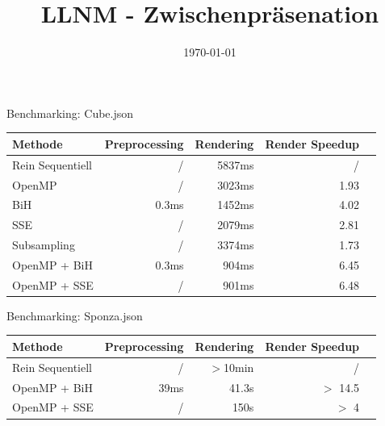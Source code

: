 


\title[LLNM]{LLNM - Zwischenpräsenation}
\subtitle{}
\date{\today}

	\begin{frame}
		\titlepage
	\end{frame}
	\begin{frame}{Benchmarking: Cube.json}
		\begin{tabular}{l*{4}{r}}
		Methode           & Preprocessing & Rendering & Render Speedup \\%
		\hline
		Rein Sequentiell  & /      & 5837ms & /      \\%
		OpenMP            & /      & 3023ms & 1.93   \\%
		BiH               & 0.3ms  & 1452ms & 4.02   \\%
		SSE               & /      & 2079ms & 2.81   \\%
		Subsampling       & /      & 3374ms & 1.73   \\%
		OpenMP + BiH      & 0.3ms  &  904ms & 6.45   \\%
		OpenMP + SSE      & /      &  901ms & 6.48   \\%
		\end{tabular}
	\end{frame}
	\begin{frame}{Benchmarking: Sponza.json}
		\begin{tabular}{l*{4}{r}}
		Methode           & Preprocessing & Rendering & Render Speedup \\%
		\hline
		Rein Sequentiell  & /      & $>$10min & /        \\
		OpenMP + BiH      & 39ms   & 41.3s    & $>$ 14.5 \\
		OpenMP + SSE      & /      & 150s     & $>$ 4    \\
		\end{tabular}
	\end{frame}
